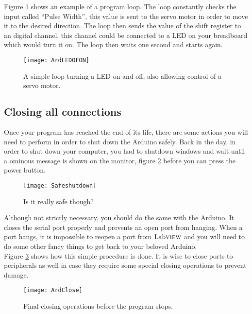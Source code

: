 Figure \ref{ProgLoopArd} shows an example of a program loop. The loop constantly checks the input called ``Pulse Width'', this value is sent to the servo motor in order to move it to the desired direction. The loop then sends the value of the shift register to an digital channel, this channel could be connected to a LED on your breadboard which would turn it on. The loop then waits one second and starts again.\\
\begin{figure}
	\centering
	\texttt{[image: ArdLEDOFON]}
	\caption{A simple loop turning a LED on and off, also allowing control of a servo motor.}
	\label{ProgLoopArd}
\end{figure}
\subsection{Closing all connections}
Once your program has reached the end of its life, there are some actions you will need to perform in order to shut down the Arduino safely. Back in the day, in order to shut down your computer, you had to shutdown windows and wait until a ominous message is shown on the monitor, figure \ref{Shutdown98} before you can press the power button.\\
\begin{figure}
	\centering
	\texttt{[image: Safeshutdown]}
	\caption{Is it really safe though?}
	\label{Shutdown98}
\end{figure}

Although not strictly necessary, you should do the same with the Arduino. It closes the serial port properly and prevents an open port from hanging. When a port hangs, it is impossible to reopen a port from $\text{Lab}\textsc{view}$ and you will need to do some other fancy things to get back to your beloved Arduino.\\

Figure \ref{ArdClose} shows how this simple procedure is done. It is wise to close ports to peripherals as well in case they require some special closing operations to prevent damage.
\begin{figure}
	\centering
	\texttt{[image: ArdClose]}
	\caption{Final closing operations before the program stops.}
	\label{ArdClose}
\end{figure}
